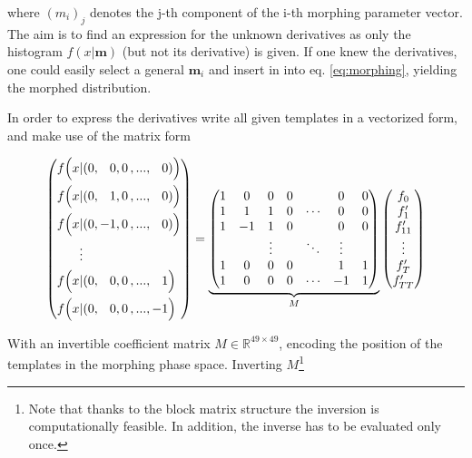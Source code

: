 where $(m_i)_j$ denotes the j-th component of the i-th morphing parameter vector. The aim is to find an expression for the unknown derivatives as only the histogram $f(x|\mathbf{m})$ (but not its derivative) is given. If one knew the derivatives, one could easily select a general $\mathbf{m}_i$ and insert in into eq. \ref{eq:morphing}, yielding the morphed distribution.

In order to express the derivatives write all given templates in a vectorized form, and make use of the matrix form

\begin{equation*}
	\left(\begin{aligned}
		f\Bigl(x &| (0,\phantom{-}0, 0\,,...,\phantom{-}0)\Bigl) \\
		f\Bigl(x &| (0,\phantom{-}1, 0\,,...,\phantom{-}0)\Bigl) \\
		f\Bigl(x &| (0,-1, 0\,,...,\phantom{-}0)\Bigl) \\
		&\vdots \\
		f\Bigl(x &| (0,\phantom{-}0, 0\,,...,\phantom{-}1\Bigl) \\
		f\Bigl(x &| (0,\phantom{-}0, 0\,,...,-1\Bigl) \\
	\end{aligned}\right) = \underbrace{\left(\begin{matrix}
		1 & 0 & 0 & 0 & & 0 & 0 \\
		1 & 1 & 1 & 0 &  \cdots & 0 & 0 \\
		1 & -1 & 1 & 0 &      & 0 & 0 \\
		& & \vdots & & \ddots & \vdots & \\
		1 & 0 & 0 & 0 &       & 1 & 1 \\
		1 & 0 & 0 & 0 & \cdots & -1 & 1 \\
	\end{matrix}\right)}_{M} \left(\begin{matrix}
	f_0 \\
	f'_1 \\
	f'_{11} \\
	\vdots \\
	f'_T \\
	f'_{TT}
\end{matrix}\right)
\end{equation*}

With an invertible coefficient matrix $M \in \mathbb{R}^{49\times49}$, encoding the position of the templates in the morphing phase space. Inverting $M$\footnote{Note that thanks to the block matrix structure the inversion is computationally feasible. In addition, the inverse has to be evaluated only once.}

